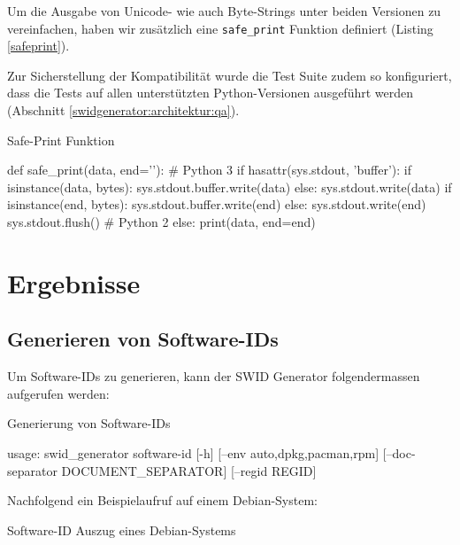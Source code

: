 Um die Ausgabe von Unicode- wie auch Byte-Strings unter beiden Versionen zu
vereinfachen, haben wir zusätzlich eine \texttt{safe\_print} Funktion definiert
(Listing \ref{safeprint}).

Zur Sicherstellung der Kompatibilität wurde die Test Suite zudem so
konfiguriert, dass die Tests auf allen unterstützten Python-Versionen ausgeführt
werden (Abschnitt \ref{swidgenerator:architektur:qa}).

\newpage
\begin{listing}[t!]
\caption{Safe-Print Funktion}
\label{safeprint}
\begin{pythoncode}
def safe_print(data, end='\n'):
    # Python 3
    if hasattr(sys.stdout, 'buffer'):
        if isinstance(data, bytes):
            sys.stdout.buffer.write(data)
        else:
            sys.stdout.write(data)
        if isinstance(end, bytes):
            sys.stdout.buffer.write(end)
        else:
            sys.stdout.write(end)
        sys.stdout.flush()
    # Python 2
    else:
        print(data, end=end)
\end{pythoncode}
\end{listing}



\section{Ergebnisse}

\subsection{Generieren von Software-IDs}

Um Software-IDs zu generieren, kann der SWID Generator folgendermassen aufgerufen werden:

\begin{listing}[H]
\caption{Generierung von Software-IDs}
\begin{textcode}
usage: swid_generator software-id [-h] [--env {auto,dpkg,pacman,rpm}]
                                  [--doc-separator DOCUMENT_SEPARATOR]
                                  [--regid REGID]
\end{textcode}
\end{listing}

Nachfolgend ein Beispielaufruf auf einem Debian-System:

\begin{listing}[H]
\caption{Software-ID Auszug eines Debian-Systems}
\end{listing}


